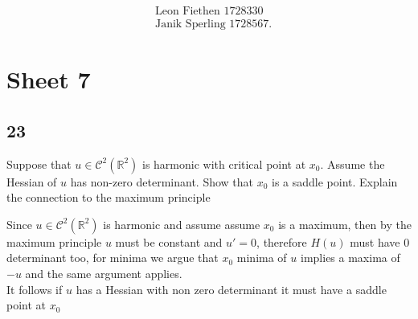 
\begin{align*}
  &\text{Leon Fiethen 1728330}\\
 &\text{Janik Sperling 1728567}
.\end{align*}
\section*{Sheet 7}
\subsection*{23}
\begin{question}
Suppose that $u \in  \mathcal{C}^2(\mathbb{R}^{2} )$ is harmonic with 
critical point at $x_{0}$. Assume the Hessian of $u$ has non-zero determinant. Show 
that $x_{0}$ is a saddle point. Explain the connection
to the maximum principle  
\end{question}
\begin{solution}
  Since $u \in  \mathcal{C}^2(\mathbb{R}^{2} )$  is harmonic and assume 
  assume $x_{0}$ is a maximum, then by the maximum principle $u$ must be constant and $u' = 0$, 
  therefore $H(u)$ must have 0 determinant too, for minima we argue that $x_{0}$ minima of $u$ implies
  a maxima of $-u$ and the same argument applies. \\[1ex]
  It follows if $u$ has a Hessian with non zero determinant it must have a saddle point at $x_{0}$
\end{solution}
